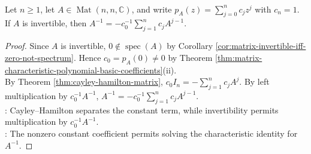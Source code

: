 \begin{corollary} \label{cor:inverse-from-characteristic-polynomial} \\
Let $n\geq1$, let $A\in\operatorname{Mat}(n,n,\mathbb{C})$, and write $p_A(z)=\sum\limits_{j=0}^{n}c_jz^j$ with $c_n=1$. If $A$ is invertible, then $A^{-1}=-c_0^{-1}\sum\limits_{j=1}^{n}c_jA^{j-1}$.
\begin{proof}
Since $A$ is invertible, $0\notin\operatorname{spec}(A)$ by Corollary \ref{cor:matrix-invertible-iff-zero-not-spectrum}. Hence $c_0=p_A(0)\neq0$ by Theorem \ref{thm:matrix-characteristic-polynomial-basic-coefficients}(ii).\\
By Theorem \ref{thm:cayley-hamilton-matrix}, $c_0I_n=-\sum\limits_{j=1}^{n}c_jA^j$. By left multiplication by $c_0^{-1}A^{-1}$, $A^{-1}=-c_0^{-1}\sum\limits_{j=1}^{n}c_jA^{j-1}$.\\
: Cayley--Hamilton separates the constant term, while invertibility permits multiplication by $c_0^{-1}A^{-1}$.\\
: The nonzero constant coefficient permits solving the characteristic identity for $A^{-1}$.
\end{proof}
\end{corollary}

